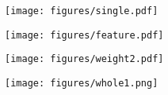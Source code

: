 \begin{figure*}
\begin{minipage}[c]{0.2\linewidth}
\texttt{[image: figures/single.pdf]}
\label{single}
\end{minipage}
\begin{minipage}[c]{0.18\linewidth}
\texttt{[image: figures/feature.pdf]}
\label{single_feature}
\end{minipage}
\begin{minipage}[c]{0.18\linewidth}
\texttt{[image: figures/weight2.pdf]}
\label{single_feature}
\end{minipage}
\begin{minipage}[c]{0.43\linewidth}
\texttt{[image: figures/whole1.png]}
\label{whole}
\end{minipage}
\end{figure*}
